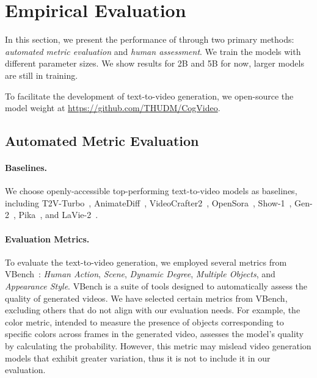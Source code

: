\section{Empirical Evaluation}

In this section, we present the performance of \model through two primary methods: \textit{automated metric evaluation} and \textit{human assessment}. %
We train the \model models with different parameter sizes. 
We show results for 2B and 5B for now, larger models are still in training.

To facilitate the development of text-to-video generation, we open-source the model weight at \url{https://github.com/THUDM/CogVideo}.



\subsection{Automated Metric Evaluation} 

\paragraph{Baselines.} 
We choose openly-accessible top-performing text-to-video models as baselines, including T2V-Turbo~\citep{li2024t2v}, AnimateDiff~\citep{guo2023animatediff}, VideoCrafter2~\citep{chen2024videocrafter2}, OpenSora~\citep{opensora}, Show-1~\citep{zhang2023show}, Gen-2~\citep{gen2}, Pika~\citep{pika}, and LaVie-2~\citep{wang2023lavie}.




\paragraph{Evaluation Metrics.} 
To evaluate the text-to-video generation, we employed several metrics from VBench~\citep{huang2023vbench}: \emph{Human Action}, \emph{Scene}, \emph{Dynamic Degree}, \emph{Multiple Objects}, and \emph{Appearance Style}. 
VBench is a suite of tools designed to automatically assess the quality of generated videos. We have selected certain metrics from VBench, excluding others that do not align with our evaluation needs. 
For example, the color metric, intended to measure the presence of objects corresponding to specific colors across frames in the generated video, assesses the model's quality by calculating the probability. 
However, this metric may mislead video generation models that exhibit greater variation, thus it is not to include it in our evaluation. 

